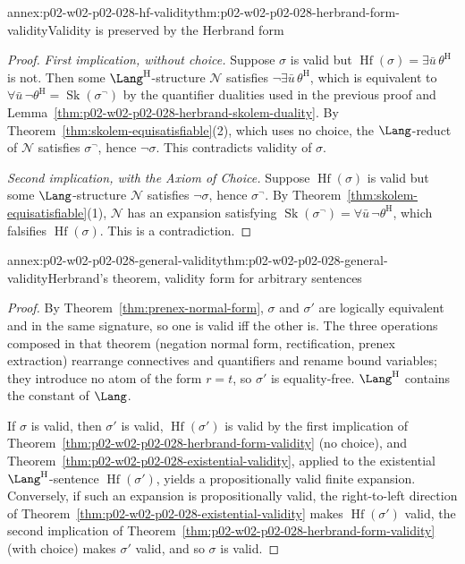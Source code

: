 \begin{annexitem}{annex:p02-w02-p02-028-hf-validity}{thm:p02-w02-p02-028-herbrand-form-validity}{Validity is preserved by the Herbrand form}
\begin{proof}
\emph{First implication, without choice.}  Suppose \(\sigma\) is valid but
\(\operatorname{Hf}(\sigma)=\exists\bar u\,\theta^{\mathrm H}\) is not.  Then
some \(\Lang^{\mathrm H}\)-structure \(\mathcal N\) satisfies
\(\neg\exists\bar u\,\theta^{\mathrm H}\), which is equivalent to
\(\forall\bar u\,\neg\theta^{\mathrm H}=\operatorname{Sk}(\sigma^{\neg})\) by
the quantifier dualities used in the previous proof and
Lemma~\ref{thm:p02-w02-p02-028-herbrand-skolem-duality}.  By
Theorem~\ref{thm:skolem-equisatisfiable}(2), which uses no choice, the
\(\Lang\)-reduct of \(\mathcal N\) satisfies \(\sigma^{\neg}\), hence
\(\neg\sigma\).  This contradicts validity of \(\sigma\).

\emph{Second implication, with the Axiom of Choice.}  Suppose
\(\operatorname{Hf}(\sigma)\) is valid but some \(\Lang\)-structure
\(\mathcal N\) satisfies \(\neg\sigma\), hence \(\sigma^{\neg}\).  By
Theorem~\ref{thm:skolem-equisatisfiable}(1), \(\mathcal N\) has an expansion
satisfying \(\operatorname{Sk}(\sigma^{\neg})=\forall\bar u\,\neg\theta^{\mathrm H}\),
which falsifies \(\operatorname{Hf}(\sigma)\).  This is a contradiction.
\end{proof}
\end{annexitem}

\begin{annexitem}{annex:p02-w02-p02-028-general-validity}{thm:p02-w02-p02-028-general-validity}{Herbrand's theorem, validity form for arbitrary sentences}
\begin{proof}
By Theorem~\ref{thm:prenex-normal-form}, \(\sigma\) and \(\sigma'\) are
logically equivalent and in the same signature, so one is valid iff the
other is.  The three operations composed in that theorem (negation normal
form, rectification, prenex extraction) rearrange connectives and
quantifiers and rename bound variables; they introduce no atom of the form
\(r=t\), so \(\sigma'\) is equality-free.  \(\Lang^{\mathrm H}\) contains
the constant of \(\Lang\).

If \(\sigma\) is valid, then \(\sigma'\) is valid, \(\operatorname{Hf}(\sigma')\)
is valid by the first implication of
Theorem~\ref{thm:p02-w02-p02-028-herbrand-form-validity} (no choice), and
Theorem~\ref{thm:p02-w02-p02-028-existential-validity}, applied to the
existential \(\Lang^{\mathrm H}\)-sentence \(\operatorname{Hf}(\sigma')\),
yields a propositionally valid finite expansion.  Conversely, if such an
expansion is propositionally valid, the right-to-left direction of
Theorem~\ref{thm:p02-w02-p02-028-existential-validity} makes
\(\operatorname{Hf}(\sigma')\) valid, the second implication of
Theorem~\ref{thm:p02-w02-p02-028-herbrand-form-validity} (with choice) makes
\(\sigma'\) valid, and so \(\sigma\) is valid.
\end{proof}
\end{annexitem}

